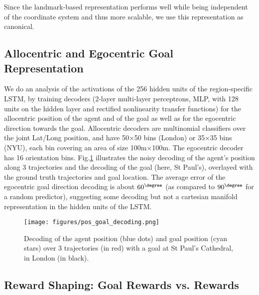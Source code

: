 Since the landmark-based representation performs well while being independent of the coordinate system and thus more scalable, we use this representation as canonical.


\subsection{Allocentric and Egocentric Goal Representation}
\label{supp:representation}

We do an analysis of the activations of the 256 hidden units of the region-specific LSTM, by training decoders (2-layer multi-layer perceptrons, MLP, with 128 units on the hidden layer and rectified nonlinearity transfer functions) for the allocentric position of the agent and of the goal as well as for the egocentric direction towards the goal. Allocentric decoders are multinomial classifiers over the joint Lat/Long position, and have 50$\times$50 bins (London) or 35$\times$35 bins (NYU), each bin covering an area of size 100m$\times$100m. The egocentric decoder has 16 orientation bins. Fig.\ref{fig:decoding} illustrates the noisy decoding of the agent's position along 3 trajectories and the decoding of the goal (here, St Paul's), overlayed with the ground truth trajectories and goal location. The average error of the egocentric goal direction decoding is about $60^{\degree}$ (as compared to $90^{\degree}$ for a random predictor), suggesting some decoding but not a cartesian manifold representation in the hidden units of the LSTM.   

\begin{figure}[ht]
\begin{center}
\centerline{\texttt{[image: figures/pos\_goal\_decoding.png]}}
\caption{Decoding of the agent position (blue dots) and goal position (cyan stars) over 3 trajectories (in red) with a goal at St Paul's Cathedral, in London (in black).}
\label{fig:decoding}
\end{center}
\vskip -0.4in
\end{figure}

\subsection{Reward Shaping: Goal Rewards vs. Rewards}
\label{supp:rewards}

